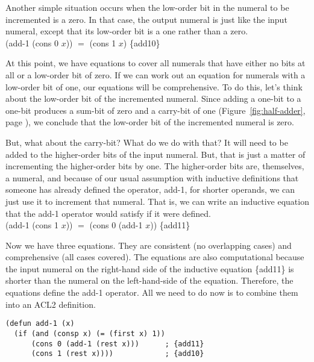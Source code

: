 Another simple situation occurs when the low-order bit in the
numeral to be incremented is a zero.
In that case, the output numeral is
just like the input numeral, except that its
low-order bit is a one rather than a zero.
\\
\vspace{2mm}
\hspace*{2cm}
\textsf{(add-1 (cons 0 $x$))} $=$ \textsf{(cons 1 $x$)}    \hfill \{add10\}

At this point, we have equations to cover all numerals
that have either no bits at all or a low-order bit
of zero. If we can work out an equation for numerals
with a low-order bit of one, our equations will be comprehensive.
To do this, let's think about the
low-order bit of the incremented numeral.
Since adding a one-bit to a one-bit produces a sum-bit
of zero and a carry-bit of one
(Figure~\ref{fig:half-adder}, page \pageref{fig:half-adder}),
we conclude that the low-order bit of the incremented numeral
is zero.

But, what about the carry-bit? What do we do with that?
It will need to be added to the higher-order bits of
the input numeral. But, that is just a matter of incrementing
the higher-order bits by one.
The higher-order bits are, themselves, a numeral,
and because of our usual assumption with inductive definitions that
someone has already defined the operator,
\textsf{add-1}, for shorter operands,
we can just use it to increment that numeral.
That is, we can write an inductive equation that the \textsf{add-1} operator
would satisfy if it were defined.
\\
\vspace{2mm}
\hspace*{2cm}
\textsf{(add-1 (cons 1 $x$))} $=$ \textsf{(cons 0 (add-1 $x$))}   \hfill \{add11\}

Now we have three equations.
They are consistent (no overlapping cases) and
comprehensive (all cases covered).
The equations are also computational because the input numeral
on the right-hand side of the inductive equation
\{add11\} is shorter than
the numeral on the left-hand-side of the equation.
Therefore, the equations define the \textsf{add-1} operator.
All we need to do now is to combine them into an ACL2 definition.

\label{add-1-defun}
\begin{Verbatim}
(defun add-1 (x)
  (if (and (consp x) (= (first x) 1))
      (cons 0 (add-1 (rest x)))      ; {add11}
      (cons 1 (rest x))))            ; {add10}
\end{Verbatim}

